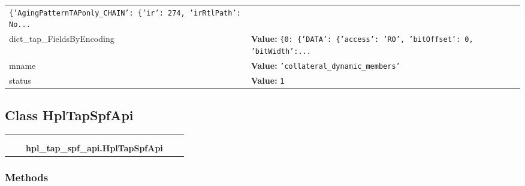 \begin{longtable}{|p{\varnamewidth}|p{\vardescrwidth}|l}
{\tt \texttt{\{}\texttt{'}\texttt{AgingPatternTAPonly\_CHAIN}\texttt{'}\texttt{: }\texttt{\{}\texttt{'}\texttt{ir}\texttt{'}\texttt{: }274\texttt{, }\texttt{'}\texttt{irRtlPath}\texttt{'}\texttt{: }No\texttt{...}}&\\
\cline{1-2}
\raggedright d\-i\-c\-t\-\_\-t\-a\-p\-\_\-F\-i\-e\-l\-d\-s\-B\-y\-E\-n\-c\-o\-d\-i\-n\-g\- & \raggedright \textbf{Value:} 
{\tt \texttt{\{}0\texttt{: }\texttt{\{}\texttt{'}\texttt{DATA}\texttt{'}\texttt{: }\texttt{\{}\texttt{'}\texttt{access}\texttt{'}\texttt{: }\texttt{'}\texttt{RO}\texttt{'}\texttt{, }\texttt{'}\texttt{bitOffset}\texttt{'}\texttt{: }0\texttt{, }\texttt{'}\texttt{bitWidth}\texttt{'}\texttt{:}\texttt{...}}&\\
\cline{1-2}
\raggedright m\-n\-a\-m\-e\- & \raggedright \textbf{Value:} 
{\tt \texttt{'}\texttt{collateral\_dynamic\_members}\texttt{'}}&\\
\cline{1-2}
\raggedright s\-t\-a\-t\-u\-s\- & \raggedright \textbf{Value:} 
{\tt 1}&\\
\cline{1-2}
\end{longtable}



\subsection{Class HplTapSpfApi}

    \label{hpl_tap_spf_api:HplTapSpfApi}
\begin{tabular}{cccccc}
\multicolumn{2}{r}{\settowidth{\BCL}{object}\multirow{2}{\BCL}{object}}
&&
  \\\cline{3-3}
  &&\multicolumn{1}{c|}{}
&&
  \\
&&\multicolumn{2}{l}{\textbf{hpl\_tap\_spf\_api.HplTapSpfApi}}
\end{tabular}



  \subsubsection{Methods}

